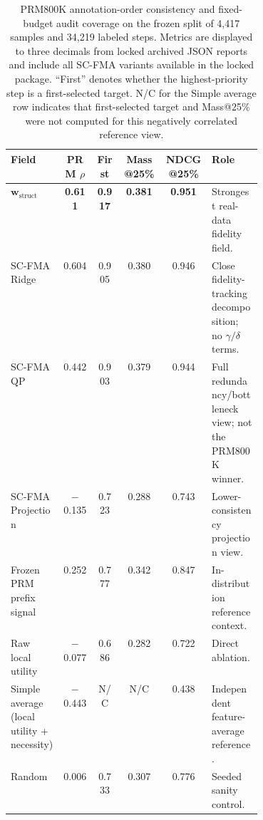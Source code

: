 \documentclass[pdflatex,sn-mathphys-num,iicol]{sn-jnl}
\newcommand{\wstruct}{\ensuremath{\mathbf{w}_{\mathrm{struct}}}}
\begin{document}
\begin{table}[t]
\caption{PRM800K annotation-order consistency and fixed-budget audit coverage on the frozen split of 4,417 samples and 34,219 labeled steps. Metrics are displayed to three decimals from locked archived JSON reports and include all SC-FMA variants available in the locked package. ``First'' denotes whether the highest-priority step is a first-selected target. N/C for the Simple average row indicates that first-selected target and Mass@25\% were not computed for this negatively correlated reference view.}
\label{tab:prm800k-audit}
\centering
\scriptsize
\renewcommand{\arraystretch}{1.08}
\begin{tabular}{Z{0.21\linewidth}ccccZ{0.20\linewidth}}
\toprule
\textbf{Field} & \textbf{PRM $\rho$} & \textbf{First} & \textbf{Mass@25\%} & \textbf{NDCG@25\%} & \textbf{Role} \\
\midrule
\wstruct{} & \textbf{0.611} & \textbf{0.917} & \textbf{0.381} & \textbf{0.951} & Strongest real-data fidelity field. \\
SC-FMA Ridge & 0.604 & 0.905 & 0.380 & 0.946 & Close fidelity-tracking decomposition; no $\gamma/\delta$ terms. \\
SC-FMA QP & 0.442 & 0.903 & 0.379 & 0.944 & Full redundancy/bottleneck view; not the PRM800K winner. \\
SC-FMA Projection & $-$0.135 & 0.723 & 0.288 & 0.743 & Lower-consistency projection view. \\
Frozen PRM prefix signal & 0.252 & 0.777 & 0.342 & 0.847 & In-distribution reference context. \\
Raw local utility & $-$0.077 & 0.686 & 0.282 & 0.722 & Direct ablation. \\
Simple average (local utility + necessity) & $-$0.443 & N/C & N/C & 0.438 & Independent feature-average reference. \\
Random & 0.006 & 0.733 & 0.307 & 0.776 & Seeded sanity control. \\
\bottomrule
\end{tabular}
\end{table}
\end{document}
